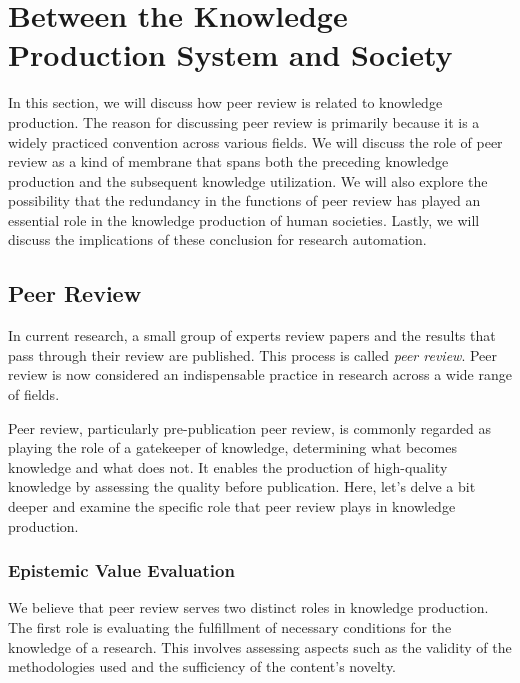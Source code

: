 \documentclass{book}
\begin{document}
\section{Between the Knowledge Production System and Society}
In this section, we will discuss how peer review is related to knowledge production. The reason for discussing peer review is primarily because it is a widely practiced convention across various fields. We will discuss the role of peer review as a kind of membrane that spans both the preceding knowledge production and the subsequent knowledge utilization. We will also explore the possibility that the redundancy in the functions of peer review has played an essential role in the knowledge production of human societies. Lastly, we will discuss the implications of these conclusion for research automation.





\subsection{Peer Review}
In current research, a small group of experts review papers and the results that pass through their review are published. This process is called \textit{peer review}. Peer review is now considered an indispensable practice in research across a wide range of fields.

Peer review, particularly pre-publication peer review, is commonly regarded as playing the role of a gatekeeper of knowledge, determining what becomes knowledge and what does not. It enables the production of high-quality knowledge by assessing the quality before publication. Here, let's delve a bit deeper and examine the specific role that peer review plays in knowledge production.

\subsubsection{Epistemic Value Evaluation}

We believe that peer review serves two distinct roles in knowledge production. The first role is evaluating the fulfillment of necessary conditions for the knowledge of a research. This involves assessing aspects such as the validity of the methodologies used and the sufficiency of the content's novelty. 
\end{document}
